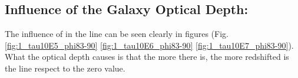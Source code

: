 \subsection{Influence of the Galaxy Optical Depth: \tauh}
The influence of \tauh in the \lya line can be seen clearly in figures (Fig. \ref{fig:1_tau10E5_phi83-90} \ref{fig:1_tau10E6_phi83-90} \ref{fig:1_tau10E7_phi83-90}). What the optical depth causes is that the more \tauh there is, the more redshifted is the line respect to the zero value. \\